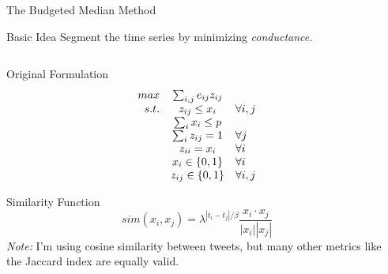 \documentclass[compress]{beamer}
\begin{document}
\begin{frame}{The Budgeted Median Method}

\begin{block}{Basic Idea}
Segment the time series by minimizing \textit{conductance}.
\end{block}

\begin{columns}[t]
\begin{column}[1]{3.5cm}
\begin{overprint}
\begin{center}{
Original Formulation
\[
\begin{array}{r c l }
max & \sum_{i,j} e_{ij}z_{ij} & \\
s.t. & z_{ij} \leq x_i & \forall i,j \\
& \sum_i x_i \leq p & \\
& \sum_i z_{ij} = 1 & \forall j \\
& z_{ii} = x_i & \forall i \\
& x_i \in \{0,1\} & \forall i \\
& z_{ij} \in \{0,1\} & \forall i,j \\
\end{array}
\]
}\end{center}
\begin{center}{
Similarity Function
\[
sim(x_i, x_j) = \lambda^{|t_i - t_j|/\beta} \frac{x_i \cdot x_j}{|x_i||x_j|}
\]
{\tiny
\textit{Note:} I'm using cosine similarity between tweets, but many other
metrics like the Jaccard index are equally valid.
}
}\end{center}
\end{overprint}
\end{column}

\begin{column}[2]{5cm}
\begin{center}
\end{center}
\end{column}
\end{columns}

\end{frame}
\end{document}
